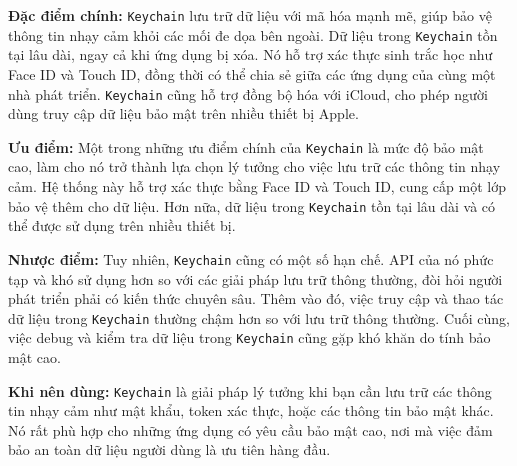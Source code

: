 \textbf{Đặc điểm chính:} \texttt{Keychain} lưu trữ dữ liệu với mã hóa mạnh mẽ, giúp bảo vệ thông tin nhạy cảm khỏi các mối đe dọa bên ngoài. Dữ liệu trong \texttt{Keychain} tồn tại lâu dài, ngay cả khi ứng dụng bị xóa. Nó hỗ trợ xác thực sinh trắc học như Face ID và Touch ID, đồng thời có thể chia sẻ giữa các ứng dụng của cùng một nhà phát triển. \texttt{Keychain} cũng hỗ trợ đồng bộ hóa với iCloud, cho phép người dùng truy cập dữ liệu bảo mật trên nhiều thiết bị Apple.

\textbf{Ưu điểm:} Một trong những ưu điểm chính của \texttt{Keychain} là mức độ bảo mật cao, làm cho nó trở thành lựa chọn lý tưởng cho việc lưu trữ các thông tin nhạy cảm. Hệ thống này hỗ trợ xác thực bằng Face ID và Touch ID, cung cấp một lớp bảo vệ thêm cho dữ liệu. Hơn nữa, dữ liệu trong \texttt{Keychain} tồn tại lâu dài và có thể được sử dụng trên nhiều thiết bị.

\textbf{Nhược điểm:} Tuy nhiên, \texttt{Keychain} cũng có một số hạn chế. API của nó phức tạp và khó sử dụng hơn so với các giải pháp lưu trữ thông thường, đòi hỏi người phát triển phải có kiến thức chuyên sâu. Thêm vào đó, việc truy cập và thao tác dữ liệu trong \texttt{Keychain} thường chậm hơn so với lưu trữ thông thường. Cuối cùng, việc debug và kiểm tra dữ liệu trong \texttt{Keychain} cũng gặp khó khăn do tính bảo mật cao.

\textbf{Khi nên dùng:} \texttt{Keychain} là giải pháp lý tưởng khi bạn cần lưu trữ các thông tin nhạy cảm như mật khẩu, token xác thực, hoặc các thông tin bảo mật khác. Nó rất phù hợp cho những ứng dụng có yêu cầu bảo mật cao, nơi mà việc đảm bảo an toàn dữ liệu người dùng là ưu tiên hàng đầu.